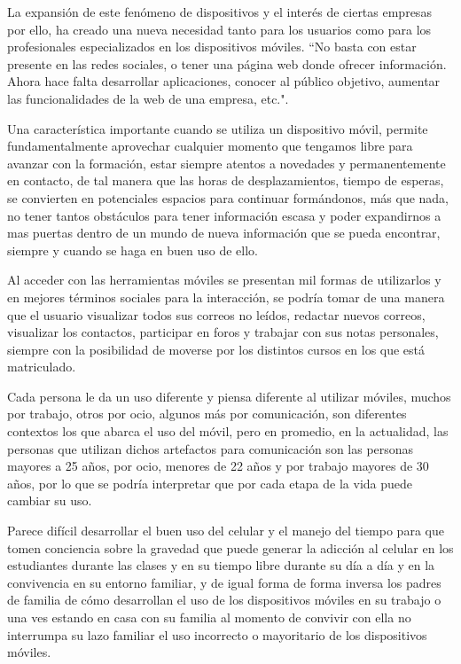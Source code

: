 \documentclass[10pt,a4paper]{article}
\begin{document}
La expansi{\'o}n de este fen{\'o}meno de dispositivos y el inter{\'e}s de ciertas empresas por ello, ha creado una nueva necesidad tanto para los usuarios como para los profesionales especializados en los dispositivos m{\'o}viles. ``No basta con estar presente en las redes sociales, o tener una p{\'a}gina web donde ofrecer informaci{\'o}n. Ahora hace falta desarrollar aplicaciones, conocer al p{\'u}blico objetivo, aumentar las funcionalidades de la web de una empresa, etc.".

Una caracter{\'i}stica importante cuando se utiliza un dispositivo m{\'o}vil, permite fundamentalmente aprovechar cualquier momento que tengamos libre para avanzar con la formaci{\'o}n, estar siempre atentos a novedades y permanentemente en contacto, de tal manera que las horas de desplazamientos, tiempo de esperas, se convierten en potenciales espacios para continuar form{\'a}ndonos, m{\'a}s que nada, no tener tantos obst{\'a}culos para tener informaci{\'o}n escasa y poder expandirnos a mas puertas dentro de un mundo de nueva informaci{\'o}n que se pueda encontrar, siempre y cuando se haga en buen uso de ello.

Al acceder con las herramientas m{\'o}viles se presentan mil formas de utilizarlos y en mejores t{\'e}rminos sociales para la interacci{\'o}n, se podr{\'i}a tomar de una manera que el usuario visualizar todos sus correos no le{\'i}dos, redactar nuevos correos, visualizar los contactos, participar en foros y trabajar con sus notas personales, siempre con la posibilidad de moverse por los distintos cursos en los que est{\'a} matriculado.

Cada persona le da un uso diferente y piensa diferente al utilizar m{\'o}viles, muchos por trabajo, otros por ocio, algunos m{\'a}s por comunicaci{\'o}n, son diferentes contextos los que abarca el uso del m{\'o}vil, pero en promedio, en la actualidad, las personas que utilizan dichos artefactos para comunicaci{\'o}n son las personas mayores a 25 a{\~n}os, por ocio, menores de 22 a{\~n}os y por trabajo mayores de 30 a{\~n}os, por lo que se podr{\'i}a interpretar que por cada etapa de la vida puede cambiar su uso. 

Parece dif{\'i}cil desarrollar el buen uso del celular y el manejo del tiempo para que tomen conciencia sobre la gravedad que puede generar la adicci{\'o}n al celular en los estudiantes durante las clases y en su tiempo libre durante su d{\'i}a a d{\'i}a y en la convivencia en su entorno familiar, y de igual forma de forma inversa los padres de familia de c{\'o}mo desarrollan el uso de los dispositivos m{\'o}viles en su trabajo o una ves estando en casa con su familia al momento de convivir con ella no interrumpa su lazo familiar el uso incorrecto o mayoritario de los dispositivos m{\'o}viles.
\end{document}
